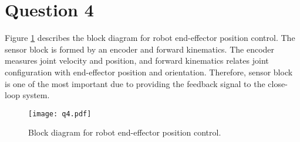 \section{Question 4}
Figure \ref{fig:q4} describes the block diagram for robot end-effector position control. The sensor block is formed by an encoder and forward kinematics. The encoder measures joint velocity and position, and forward kinematics relates joint configuration with end-effector position and orientation. Therefore, sensor block is one of the most important due to providing the feedback signal to the close-loop system.

\begin{figure}[h!]
	\centering
	\texttt{[image: q4.pdf]}
	\caption{Block diagram for robot end-effector position control.}
	\label{fig:q4}
\end{figure}